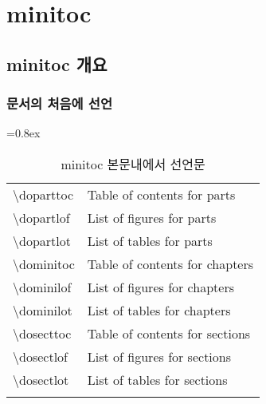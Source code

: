 

\newpage
\chapter{minitoc}
				
					\minitoc				%
					\doublespace

	\newpage
	\section{minitoc 개요}
	
	\subsection{문서의 처음에 선언}
	
				\begin{table}[h]
				\caption{minitoc 본문내에서 선언문}
				\centering 
				\tabulinesep=0.8ex
				\begin{tabu} to 0.8\textwidth { X[l, 1.0] X[l, 2] }
				\tabucline[0.2ex]{-}		
				\textbackslash doparttoc	&Table of contents for parts	\\
				\textbackslash dopartlof	&List of figures for parts	\\
				\textbackslash dopartlot	&List of tables for parts	\\
				\tabucline[0.1ex]{-}		
				\textbackslash dominitoc	&Table of contents for chapters	\\
				\textbackslash dominilof	&List of figures for chapters	\\
				\textbackslash dominilot	&List of tables for chapters	\\
				\tabucline[0.1ex]{-}		
				\textbackslash dosecttoc	&Table of contents for sections	\\
				\textbackslash dosectlof	&List of figures for sections	\\
				\textbackslash dosectlot	&List of tables for sections\\
				\tabucline[0.1ex]{-}		
				\end{tabu} 
				\end{table}
				
